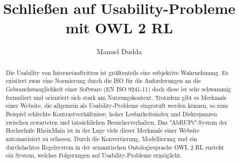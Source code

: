 \documentclass[runningheads,a4paper]{llncs}
\begin{document}
\mainmatter  %

\title{Schließen auf Usability-Probleme mit OWL 2 RL}


%
%
\author{Manuel Dudda}
%


%
%

\maketitle


\begin{abstract}
Die Usability von Internetauftritten ist größtenteils eine subjektive Wahrnehmung. Es existiert zwar eine Normierung durch die ISO für die Anforderungen an die Gebrauchstauglichkeit einer Software (EN ISO 9241-11) doch diese ist sehr schwammig formuliert und orientiert sich stark am Nutzungskontext. Trotzdem gibt es Merkmale einer Website, die allgemein als Usability-Probleme eingestuft werden können, so zum Beispiel schlechte Kontrastverhältnisse, hoher Lesbarkeitsindex und Diskrepanzen zwischen erwarteten und tatsächlichen Besucherverhalten. Das "AbRUPt"-System der Hochschule RheinMain ist in der Lage viele dieser Merkmale einer Website automatisiert zu erfassen. Durch die Konvertierung, Modellierung und ein durchdachtes Regelsystem in der semantischen Ontologiesprache OWL 2 RL ensteht ein System, welches Folgerungen auf Usability-Probleme ermöglicht.
\end{abstract}
\end{document}
